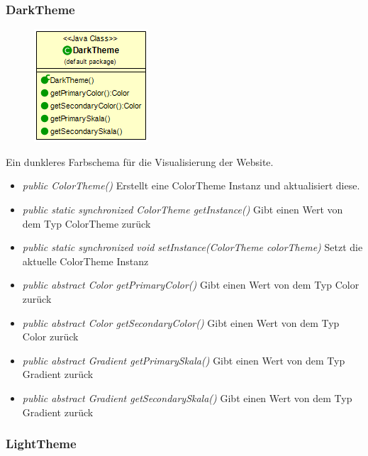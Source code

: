 \begin{itemize} [noitemsep]
\subsubsection{DarkTheme}
\begin{minipage}{0.3\textwidth}
    \begin{figure}[H]
        \includegraphics[scale = 0.5
        ]{media/view/theme/DarkTheme_Class.png}
    \end{figure}
    \end{minipage} \hfill
    \begin{minipage}{0.6\textwidth}
       Ein dunkleres Farbschema für die Visualisierung der Website.
    \end{minipage}

\begin{itemize} [noitemsep]
    \item \emph{public ColorTheme()} Erstellt eine ColorTheme Instanz und aktualisiert diese.
    \item \emph{public static synchronized ColorTheme getInstance()} Gibt einen Wert von dem Typ ColorTheme zurück
    \item \emph{public static synchronized void setInstance(ColorTheme colorTheme)} Setzt die aktuelle ColorTheme Instanz
    \item \emph{public abstract Color getPrimaryColor()} Gibt einen Wert von dem Typ Color zurück
    \item \emph{public abstract Color getSecondaryColor()} Gibt einen Wert von dem Typ Color zurück
    \item \emph{public abstract Gradient getPrimarySkala()} Gibt einen Wert von dem Typ Gradient zurück
    \item \emph{public abstract Gradient getSecondarySkala()}  Gibt einen Wert von dem Typ Gradient zurück
\end{itemize}

\subsubsection{LightTheme}


\end{itemize}
